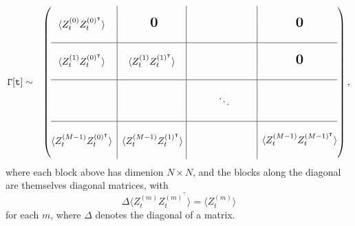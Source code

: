 \documentclass{amsart}
\newcommand{\bigzero}{\mbox{\normalfont\Large\bfseries 0}}
\begin{document}
\begin{eqnarray*}
{\tt \Gamma[t]} &\sim&
\left(\begin{array}{@{}c|c@{}|c@{}|c@{}}
&&&\\
  \begin{matrix}
\langle Z_{t}^{(0)}Z_{t}^{(0)^\intercal}\rangle 
  \end{matrix}
  & 
  \bigzero
  &
  & 
  \bigzero \\
  &&&\\
  \hline
  &&&\\
  \begin{matrix}
  \langle Z_{t}^{(1)}Z_{t}^{(0)^\intercal}\rangle 
  \end{matrix}
  & 
  \begin{matrix}
  \langle Z_{t}^{(1)}Z_{t}^{(1)^\intercal}\rangle 
  \end{matrix}\,\,\,
  & 
  &
  \bigzero
  \\
  &&&\\
  \hline
  &&&\\
  &
  &
  \hspace{1cm}\ddots\hspace{1cm}
  &
  \\
  &&&\\
\hline
&&&\\
\begin{matrix}
  \langle Z_{t}^{(M-1)}Z_{t}^{(0)^\intercal}\rangle 
  \end{matrix}
  &
  \begin{matrix}
  \langle Z_{t}^{(M-1)}Z_{t}^{(1)^\intercal}\rangle 
  \end{matrix}\,\,
  &
  &
\langle Z_{t}^{(M-1)}Z_{t}^{(M-1)^\intercal}\rangle \\
&&&\\
\end{array}\right),
\end{eqnarray*}
where each block above has dimenion $N\times N$, and the blocks along 
the diagonal are themselves diagonal matrices, with
\[
\Delta\langle Z_{t}^{(m)}Z_{t}^{(m)^\intercal}\rangle = \langle Z_{t}^{(m)}\rangle 
\]
for each $m$, where $\Delta$ denotes the diagonal of a matrix.  
\end{document}

